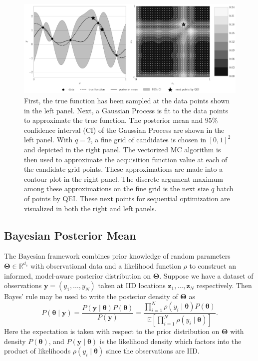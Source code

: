 \documentclass[graybox]{svmult}
\begin{document}
\begin{figure}[t]
    \centering
    \includegraphics[width=\textwidth]{figs/gp.pdf}
    \caption{First, the true function has been sampled at the data points shown in the left panel. Next, a Gaussian Process is fit to the data points to approximate the true function. The posterior mean and $95\%$ confidence interval (CI) of the Gaussian Process are shown in the left panel. With $q=2$, a fine grid of candidates is chosen in $[0,1]^{2}$ and depicted in the right panel. The vectorized MC algorithm is then used to approximate the acquisition function value at each of the candidate grid points. These approximations are made into a contour plot in the right panel. The discrete argument maximum among these approximations on the fine grid is the next size $q$ batch of points by QEI. These next points for sequential optimization are visualized in both the right and left panels. }
    \label{SoRa_fig:bo_qei}
\end{figure}

\subsection{Bayesian Posterior Mean}

The Bayesian framework combines prior knowledge of random parameters $\boldsymbol{\Theta} \in \mathbb{R}^{d_s}$ with observational data and a likelihood function $\rho$ to construct an informed, model-aware posterior distribution on $\boldsymbol{\Theta}$. Suppose we have a dataset of observations $\boldsymbol{y} = (y_1,\dots,y_{N})$ taken at IID locations $\boldsymbol{z}_1,\dots,\boldsymbol{z}_{N}$ respectively. Then Bayes' rule may be used to write the posterior density of $\boldsymbol{\Theta}$ as 
$$P\left(\boldsymbol{\theta} \mid \boldsymbol{y} \right) = \frac{P(\boldsymbol{y} \mid \boldsymbol{\theta}) P(\boldsymbol{\theta})}{P\left(\boldsymbol{y}\right)} = \frac{\prod_{i=1}^{N} \rho(y_i \mid \boldsymbol{\theta}) P(\boldsymbol{\theta})}{\mathbb{E}\left[\prod_{i=1}^{N} \rho(y_i \mid \boldsymbol{\theta})\right]}.$$
Here the expectation is taken with respect to the prior distribution on $\boldsymbol{\Theta}$ with density $P(\boldsymbol{\theta})$, and $P\left(\boldsymbol{y} \mid \boldsymbol{\theta} \right)$ is the likelihood density which factors into the product of likelihoods $\rho(y_i \mid \boldsymbol{\theta})$ since the observations are IID. 
\end{document}
